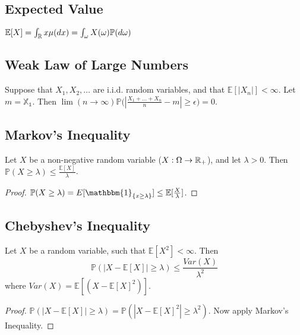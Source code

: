 \documentclass[english, course]{Notes}
\begin{document}
\subsection{Expected Value}

\begin{definition}
$\mathbb{E}[X] = \int_{\mathbb{R}} x \mu(dx) = \int_\omega X(\omega) \mathbb{P}(d\omega)$
\end{definition}

\subsection{Weak Law of Large Numbers}

\begin{theorem}
Suppose that $X_1, X_2, \dots$ are i.i.d. random variables, and that $\mathbb{E}[|X_n|] < \infty$. Let $m = \mathbb{X_1}$. Then $\lim(n \to \infty)\mathbb{P}\Big(|\frac{X_1 + \dots + X_n}{n} - m| \geq \epsilon \Big) = 0$.
\end{theorem}

\subsection{Markov's Inequality}
\begin{theorem}
Let $X$ be a non-negative random variable ($X: \Omega \to \mathbb{R}_+$), and let $\lambda > 0$. Then $\mathbb{P}(X \geq \lambda) \leq \frac{\mathbb{E}[X]}{\lambda}$.
\end{theorem}

\begin{proof}
$\mathbb{P}(X \geq \lambda) = E[\mathbbm{1}_{\{x \geq \lambda\}}] \leq \mathbb{E}[\frac{X}{\lambda}]$.
\end{proof}

\subsection{Chebyshev's Inequality}

\begin{theorem}
Let $X$ be a random variable, such that $\mathbb{E}[X^2] < \infty$. Then
\[\mathbb{P}(|X - \mathbb{E}[X]| \geq \lambda)\leq \frac{Var(X)}{\lambda^2} \]
where $Var(X) = \mathbb{E}[(X - \mathbb{E}[X]^2)]$.
\end{theorem}

\begin{proof}
$\mathbb{P}(|X - \mathbb{E}[X]| \geq \lambda) = \mathbb{P}(|X - \mathbb{E}[X]^2| \geq \lambda^2)$. Now apply Markov's Inequality.
\end{proof}
\end{document}
